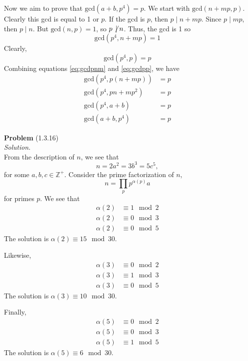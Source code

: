 \documentclass[12 pt]{amsart}
\begin{document}
  Now we aim to prove that $\text{gcd}(a + b, p^4) = p$.
  We start with $\text{gcd}(n + mp, p)$. 
  Clearly this gcd is equal to 1 or $p$.
  If the gcd is $p$, then $p \mid n + mp$.
  Since $p \mid mp$, then $p \mid n$.
  But $\text{gcd}(n, p) = 1$, so $p \not \, \mid n$.
  Thus, the gcd is 1 so
  \begin{equation} \label{eq:gcdpnm}
    \text{gcd}(p^4, n + mp) = 1
  \end{equation}
  Clearly,
  \begin{equation} \label{eq:gcdpp}
    \text{gcd}(p^4, p) = p
  \end{equation}
  Combining equations \ref{eq:gcdpnm} and \ref{eq:gcdpp}, we have
  \begin{align*}
    \text{gcd}(p^4, p(n + mp)) &= p \\
    \text{gcd}(p^4, pn + mp^2) &= p \\
    \text{gcd}(p^4, a + b) &= p \\
    \text{gcd}(a + b, p^4) &= p 
  \end{align*}

\vfill
\newpage



\phantom{\quad} \vfill
\noindent
\textbf{Problem} (1.3.16) \\[4ex]
\emph{Solution.} \\[2ex]
  From the description of $n$, we see that 
  \[
    n = 2a^2 = 3b^3 = 5c^5,
  \]
  for some $a,b,c \in \mathbb{Z}^+$.
  Consider the prime factorization of $n$,
  \[
    n = \prod_p p^{\alpha(p)}a
  \]
  for primes $p$.
  We see that 
  \begin{align*}
    \alpha(2) &\equiv 1 \mod 2 \\
    \alpha(2) &\equiv 0 \mod 3 \\
    \alpha(2) &\equiv 0 \mod 5 
  \end{align*}
  The solution is $\alpha(2) \equiv 15 \mod 30$.

  Likewise, 
  \begin{align*}
    \alpha(3) &\equiv 0 \mod 2 \\
    \alpha(3) &\equiv 1 \mod 3 \\
    \alpha(3) &\equiv 0 \mod 5 
  \end{align*}
  The solution is $\alpha(3) \equiv 10 \mod 30$.

  Finally, 
  \begin{align*}
    \alpha(5) &\equiv 0 \mod 2 \\
    \alpha(5) &\equiv 0 \mod 3 \\
    \alpha(5) &\equiv 1 \mod 5 
  \end{align*}
  The solution is $\alpha(5) \equiv 6 \mod 30$.
\end{document}
